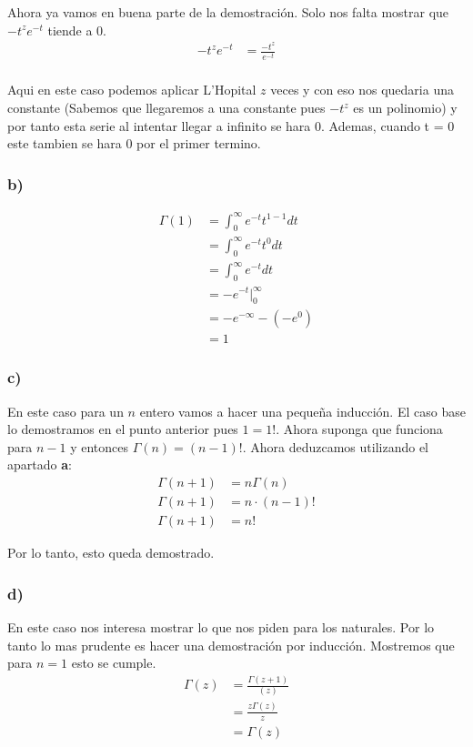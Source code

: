 \documentclass[12pt]{exam}
\begin{document}
Ahora ya vamos en buena parte de la demostración. Solo nos falta mostrar que $-t^ze^{-t}$ tiende a 0.
\begin{align*}
  -t^{z}e^{-t} &= \frac{-t^z}{e^{-t}}\\
\end{align*}

Aqui en este caso podemos aplicar L'Hopital $z$ veces y con eso nos quedaria una constante (Sabemos que llegaremos a una constante pues $-t^{z}$ es un polinomio) y por tanto esta serie al intentar llegar a infinito se hara $0$. Ademas, cuando t = 0 este tambien se hara 0 por el primer termino.

\subsubsection*{b)}
\begin{align*}
  \Gamma(1) &= \int_0^\infty e^{-t}t^{1 - 1}dt\\
  &= \int_0^\infty e^{-t}t^{0}dt\\
  &= \int_0^\infty e^{-t}dt\\
  &= -e^{-t}|_0^\infty\\
  &= -e^{-\infty} - (-e^{0})\\
  &= 1
\end{align*}
\subsubsection*{c)}

En este caso para un $n$ entero vamos a hacer una pequeña inducción. El caso base lo demostramos en el punto anterior pues $1 = 1!$. Ahora suponga que funciona para $n - 1$ y entonces $\Gamma(n) = (n - 1)!$. Ahora deduzcamos utilizando el apartado \textbf{a}:
\begin{align*}
  \Gamma(n + 1) &= n\Gamma(n)\\
  \Gamma(n + 1) &= n\cdot (n - 1)!\\
  \Gamma(n + 1) &= n!
\end{align*}

Por lo tanto, esto queda demostrado.

\subsubsection*{d)}

En este caso nos interesa mostrar lo que nos piden para los naturales. Por lo tanto lo mas prudente es hacer una demostración por inducción. Mostremos que para $n = 1$ esto se cumple.
\begin{align*}
  \Gamma(z) &= \frac{\Gamma(z + 1)}{(z)}\\
  &= \frac{z\Gamma(z)}{z}\\
  &= \Gamma(z)
\end{align*}
\end{document}
